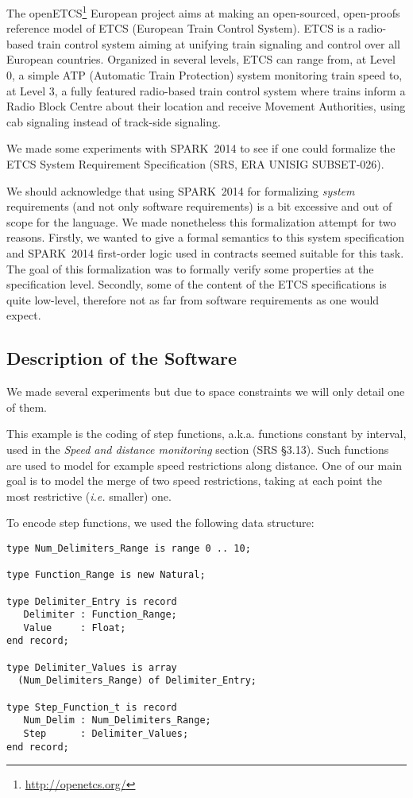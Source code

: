 \documentclass[10pt,a4paper,twocolumn]{article}
\newcommand{\openetcs}{openETCS\xspace}
\newcommand{\newspark}{SPARK~2014\xspace}
\newcommand{\ie}{\textit{i.e.}\xspace}
\newcommand{\aka}{a.k.a.\xspace}
\begin{document}

The \openetcs\footnote{\url{http://openetcs.org/}} European project
aims at making an open-sourced, open-proofs reference model of ETCS
(European Train Control System). ETCS is a radio-based train control
system aiming at unifying train signaling and control over all
European countries. Organized in several levels, ETCS can range from,
at Level 0, a simple ATP (Automatic Train Protection) system
monitoring train speed to, at Level 3, a fully featured radio-based
train control system where trains inform a Radio Block Centre about
their location and receive Movement Authorities, using cab signaling
instead of track-side signaling.

We made some experiments with \newspark to see if one could formalize
the ETCS System Requirement Specification (SRS, ERA UNISIG
SUBSET-026).

We should acknowledge that using \newspark for formalizing
\emph{system} requirements (and not only software requirements) is a
bit excessive and out of scope for the language. We made nonetheless
this formalization attempt for two reasons. Firstly, we wanted to give
a formal semantics to this system specification and \newspark
first-order logic used in contracts seemed suitable for
this task. The goal of this formalization was to formally verify some
properties at the specification level.  Secondly, some of
the content of the ETCS specifications is quite low-level, therefore
not as far from software requirements as one would expect.

\subsection{Description of the Software}

We made several experiments but due to space constraints we will only
detail one of them.

This example is the coding of step functions, \aka functions
constant by interval, used in the \textit{Speed and distance monitoring}
section (SRS §3.13). Such functions are used to model for example
speed restrictions along distance. One of our main goal is to model
the merge of two speed restrictions, taking at each point the most
restrictive (\ie smaller) one.

To encode step functions, we used the following data structure:
\begin{lstlisting}
type Num_Delimiters_Range is range 0 .. 10;

type Function_Range is new Natural;

type Delimiter_Entry is record
   Delimiter : Function_Range;
   Value     : Float;
end record;

type Delimiter_Values is array
  (Num_Delimiters_Range) of Delimiter_Entry;

type Step_Function_t is record
   Num_Delim : Num_Delimiters_Range;
   Step      : Delimiter_Values;
end record;
\end{lstlisting}
\end{document}
